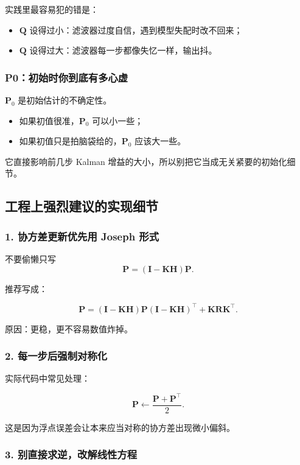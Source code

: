 \documentclass[12pt,a4paper]{ctexart}
\begin{document}
实践里最容易犯的错是：

\begin{itemize}
  \item \(\bm{Q}\) 设得过小：滤波器过度自信，遇到模型失配时改不回来；
  \item \(\bm{Q}\) 设得过大：滤波器每一步都像失忆一样，输出抖。
\end{itemize}

\subsubsection{P0：初始时你到底有多心虚}

\(\bm{P}_0\) 是初始估计的不确定性。

\begin{itemize}
  \item 如果初值很准，\(\bm{P}_0\) 可以小一些；
  \item 如果初值只是拍脑袋给的，\(\bm{P}_0\) 应该大一些。
\end{itemize}

它直接影响前几步 Kalman 增益的大小，所以别把它当成无关紧要的初始化细节。

\subsection{工程上强烈建议的实现细节}

\subsubsection{1. 协方差更新优先用 Joseph 形式}

不要偷懒只写
\[
\bm{P} = (\bm{I}-\bm{K}\bm{H})\bm{P}.
\]

推荐写成：

\[
\bm{P}
= (\bm{I} - \bm{K}\bm{H})\bm{P}(\bm{I} - \bm{K}\bm{H})^\top
+ \bm{K}\bm{R}\bm{K}^\top.
\]

原因：更稳，更不容易数值炸掉。

\subsubsection{2. 每一步后强制对称化}

实际代码中常见处理：

\[
\bm{P} \leftarrow \frac{\bm{P} + \bm{P}^\top}{2}.
\]

这是因为浮点误差会让本来应当对称的协方差出现微小偏斜。

\subsubsection{3. 别直接求逆，改解线性方程}
\end{document}
